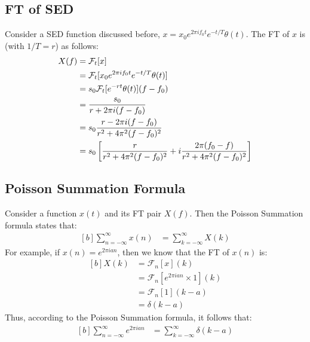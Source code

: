 \documentclass[letterpaper, 11pt]{article}
\newcommand{\sed}[2]{#2_{0}e^{2\pi if_{0}#1}e^{-#1/T} \theta (#1)} %
\newcommand{\fsum}[1]{\sum_{#1 = -\infty}^{\infty}} %
\newcommand{\fourier}[2]{\mathcal{F}_{#1}[#2]} %
\numberwithin{equation}{section}
\numberwithin{figure}{section}
\begin{document}
\subsection{FT of SED}
Consider a SED function discussed before, \(x = \sed{t}{x}\). The FT of \(x\) is (with \(1/T = r\)) as follows:
\begin{equation}
	\begin{aligned}[b]
		X(f)	&= \fourier{t}{x}\\
			&= \fourier{t}{\sed{t}{x}}\\
			&= s_{0}\fourier{t}{e^{-rt} \theta (t)}(f - f_{0})\\
			&= \frac{s_{0}}{r + 2\pi i(f - f_{0})} \\
			\gdef\temp{r^2 + 4\pi^{2}(f - f_{0})^2} %
			&= s_{0}\frac{r - 2\pi i(f - f_{0})}{\temp}\\
			&= s_{0}\left[\frac{r}{\temp} + i\frac{2\pi(f_{0} - f)}{\temp} \right]
	\end{aligned}
\end{equation}

\subsection{Poisson Summation Formula}
Consider a function \(x(t)\) and its FT pair \(X(f)\). Then the Poisson Summation formula states that:
\begin{equation}
	\begin{aligned}[b]
		\fsum{n} x(n)	&= \fsum{k} X(k)
	\end{aligned}
\end{equation}
For example, if \(x(n) = e^{2 \pi ian}\), then we know that the FT of \(x(n)\) is:
\begin{equation}
	\begin{aligned}[b]
		X(k)	&= \fourier{n}{x}(k) \\
			&= \fourier{n}{e^{2 \pi ian} \times 1}(k) \\
			&= \fourier{n}{1}(k - a) \\
			&= \delta (k - a)
	\end{aligned}
\end{equation}
Thus, according to the Poisson Summation formula, it follows that:
\begin{equation}
	\begin{aligned}[b]
		\fsum{n} e^{2 \pi ian}
			&= \fsum{k} \delta (k - a)
			\label{eq:poisson}
	\end{aligned}
\end{equation}
\end{document}
